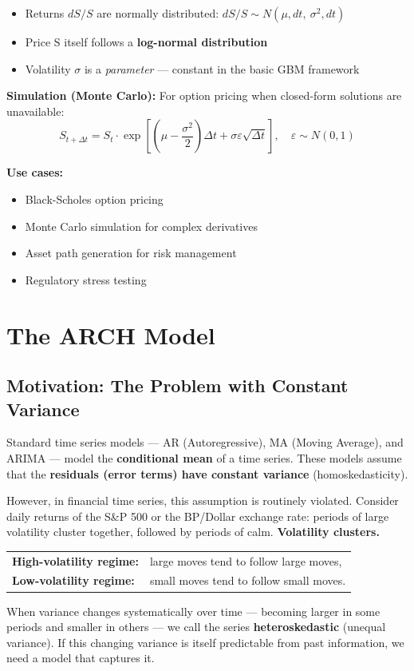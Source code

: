 \documentclass[12pt,openany]{book}
\theoremstyle{definition}
\theoremstyle{remark}
\begin{document}
\begin{itemize}
\item Returns $dS/S$ are normally distributed: $dS/S \sim N(\mu , dt, \ \sigma^2 , dt)$


\item Price S itself follows a \textbf{log-normal distribution}


\item Volatility \(\sigma\) is a \emph{parameter} --- constant in the basic GBM framework


\end{itemize}
\textbf{Simulation (Monte Carlo):} For option pricing when closed-form solutions are unavailable: \[
S_{t+\Delta t} = S_t \cdot \exp\left[\left(\mu - \frac{\sigma^2}{2}\right)\Delta t + \sigma \varepsilon \sqrt{\Delta t}\right], \quad \varepsilon \sim N(0, 1)
\]

\textbf{Use cases:}

\begin{itemize}
\item Black-Scholes option pricing


\item Monte Carlo simulation for complex derivatives


\item Asset path generation for risk management


\item Regulatory stress testing


\end{itemize}
\medskip
\section{The ARCH Model}
\subsection{Motivation: The Problem with Constant Variance}
Standard time series models --- AR (Autoregressive), MA (Moving Average), and ARIMA --- model the \textbf{conditional mean} of a time series. These models assume that the \textbf{residuals (error terms) have constant variance} (homoskedasticity).

However, in financial time series, this assumption is routinely violated. Consider daily returns of the S\&P 500 or the BP/Dollar exchange rate: periods of large volatility cluster together, followed by periods of calm. \textbf{Volatility clusters.}

\begin{center}
\begin{tabular}{@{}ll@{}}
\textbf{High-volatility regime:} & large moves tend to follow large moves,\\
\textbf{Low-volatility regime:} & small moves tend to follow small moves.
\end{tabular}
\end{center}
When variance changes systematically over time --- becoming larger in some periods and smaller in others --- we call the series \textbf{heteroskedastic} (unequal variance). If this changing variance is itself predictable from past information, we need a model that captures it.
\end{document}
